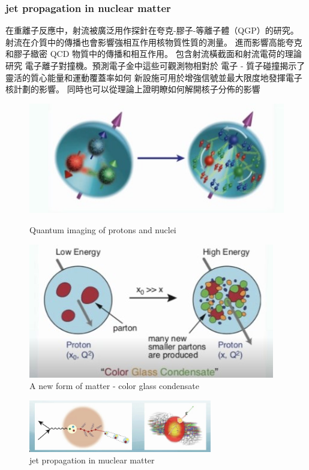 \documentclass[12pt, a4paper, oneside]{ctexart}
\begin{document}
\begin{spacing}{2.0}
\subsubsection{jet propagation in nuclear matter}
在重離子反應中，射流被廣泛用作探針在夸克-膠子-等離子體（QGP）的研究。
射流在介質中的傳播也會影響強相互作用核物質性質的測量。
進而影響高能夸克和膠子緻密 QCD 物質中的傳播和相互作用。\cite{Ovanesyan_2011}
包含射流橫截面和射流電荷的理論研究
電子離子對撞機。預測電子金中這些可觀測物相對於
電子 - 質子碰撞揭示了靈活的質心能量和運動覆蓋率如何
新設施可用於增強信號並最大限度地發揮電子核計劃的影響。
同時也可以從理論上證明瞭如何解開核子分佈的影響\cite{PhysRevLett.126.252001}
\begin{figure}
    \begin{minipage}[t]{0.5\linewidth}
        \centering
        \includegraphics[scale=0.3]{kappa.jpg}
        \caption{Quantum imaging of protons and nuclei}
        \label{fig:side:a}
      \end{minipage}%
      \begin{minipage}[t]{0.5\linewidth}
        \centering
        \includegraphics[scale=0.3]{mu.jpg}
        \caption{A new form of matter - color glass condensate}
        \label{fig:side:b}
      \end{minipage}
\end{figure}
\begin{figure}
    \centering
    \includegraphics[width=8cm]{nu.jpg}
    \caption{jet propagation in muclear matter}
\end{figure}


\end{spacing}
\end{document}
